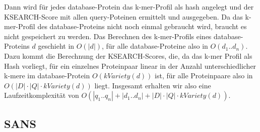 \documentclass{article}
\begin{document}
Dann wird für jedes database-Protein das k-mer-Profil als hash angelegt und der KSEARCH-Score mit allen query-Poteinen ermittelt und ausgegeben. Da das k-mer-Profil des database-Proteins nicht noch einmal gebraucht wird, braucht es nicht gespeichert zu werden. Das Berechnen des k-mer-Profils eines database-Proteins $d$ geschieht in $O(|d|)$, für alle database-Proteine also in $O(d_1..d_n)$. Dazu kommt die Berechnung der KSEARCH-Scores, die, da das k-mer Profil als Hash vorliegt, für ein einzelnes Proteinpaar linear in der Anzahl unterschiedlicher k-mere im database-Protein $O(kVariety(d))$ ist, für alle Proteinpaare also in $O(|D| \cdot |Q| \cdot kVariety(d))$ liegt. Insgesamt erhalten wir also eine Laufzeitkomplexität von $O(|q_1..q_n|+|d_1..d_n|+|D| \cdot |Q| \cdot kVariety(d))$.




\subsection{SANS}
\label{sans}
\end{document}
